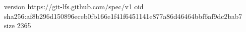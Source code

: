 version https://git-lfs.github.com/spec/v1
oid sha256:af8b296d150896eceb0fb166e1f41f6451141e877a86d46464bbf6af9dc2bab7
size 2365
